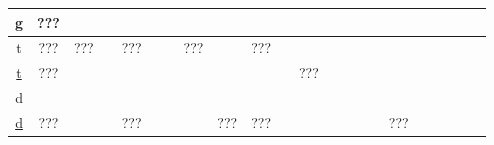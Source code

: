 \documentclass{standalone}
\newcommand{\aeg}[2][\normalsize]{{#1\pmglyph{#2}}}
\begin{document}
\begin{tabular}{|c||ccccccccccccccccccccc}
		g\sp\aeg{\Hg}             & ???              &             &     &                   &                &           & \aeg{\Hibl} &                              &           &       &             & \aeg{\HAaxii}  &       &   &     &     &               \\\hline
		t\sp\aeg{\Ht}             & ???              & ???         &     & ???               &                & \aeg{\HQ} & ???         &                              & ???       &       &             &                &       &   &     &     &               \\\hline
		\underline{t}\sp\aeg{\HT} & ???              &             &     &                   &                &           &             &                              &           &       & ???         &                &       &   &     &     &               \\\hline
		d\sp\aeg{\Hd}             &                  &             &     &                   &                &           &             &                              &           &       &             &                &       &   &     &     &               \\\hline
		\underline{d}\sp\aeg{\HD} & ???              &             &     & ???               &                &           & \aeg{\Hc}   & ???                          & ???       &       &             &                &       &   &     & ??? &               \\\hline
	\end{tabular}
\end{document}
